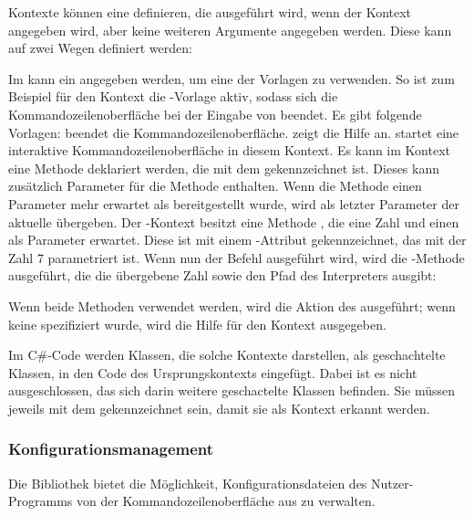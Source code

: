 Kontexte können eine  definieren, die ausgeführt wird, wenn der Kontext angegeben wird, aber keine weiteren Argumente angegeben werden.
Diese kann auf zwei Wegen definiert werden:
\begin{outline}
 \1 Im  kann ein  angegeben werden, um eine der Vorlagen zu verwenden.
 So ist zum Beispiel für den  Kontext die -Vorlage aktiv,
 sodass sich die Kommandozeilenoberfläche bei der Eingabe von  beendet.
 Es gibt folgende Vorlagen:
 \2  beendet die Kommandozeilenoberfläche.
 \2  zeigt die Hilfe an.
 \2  startet eine interaktive Kommandozeilenoberfläche in diesem Kontext.
 \1 Es kann im Kontext eine Methode deklariert werden, die mit dem  gekennzeichnet ist.
 Dieses kann zusätzlich Parameter für die Methode enthalten.
 Wenn die Methode einen Parameter mehr erwartet als bereitgestellt wurde, wird als letzter Parameter der aktuelle  übergeben.
 Der -Kontext besitzt eine Methode ,
 die eine Zahl und einen  als Parameter erwartet.
 Diese ist mit einem -Attribut gekennzeichnet, das mit der Zahl 7 parametriert ist.
 Wenn nun der Befehl  ausgeführt wird, wird die -Methode ausgeführt, die die übergebene Zahl sowie den Pfad des Interpreters ausgibt:
\end{outline}
Wenn beide Methoden verwendet werden, wird die Aktion des  ausgeführt;
wenn keine spezifiziert wurde, wird die Hilfe für den Kontext ausgegeben.

Im C\#-Code werden Klassen, die solche Kontexte darstellen, als geschachtelte Klassen, in den Code des Ursprungskontexts eingefügt.
Dabei ist es nicht ausgeschlossen, das sich darin weitere geschactelte Klassen befinden.
Sie müssen jeweils mit dem  gekennzeichnet sein, damit sie als Kontext erkannt werden.  
 

\subsubsection{Konfigurationsmanagement}\label{ConfigurationManagement}
Die Bibliothek bietet die Möglichkeit, Konfigurationsdateien des Nutzer-Programms von der Kommandozeilenoberfläche aus zu verwalten.

